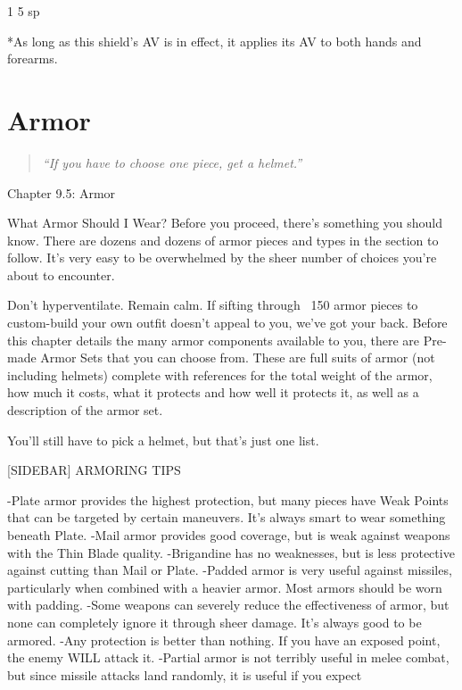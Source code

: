 \documentclass[oneside,11pt,english]{book}
\begin{document}
1 5 sp 

*As long as this shield’s AV is in effect, it applies its AV to both hands and forearms. 

 

\chapter{Armor}
\startcontents[chapters]
\clearpage
\begin{quote}
	\centering
	\emph{“If you have to choose one piece, get a helmet.” }
\end{quote}
Chapter 9.5: Armor

What Armor Should I Wear?
Before you proceed, there’s something you should know. There are dozens and dozens of armor pieces and types in 
the section to follow. It’s very easy to be overwhelmed by the sheer number of choices you’re about to encounter. 

Don’t hyperventilate. Remain calm. If sifting through ~150 armor pieces to custom-build your own outfit doesn’t 
appeal to you, we’ve got your back. Before this chapter details the many armor components available to you, there are
Pre-made Armor Sets that you can choose from. These are full suits of armor (not including helmets) complete with 
references for the total weight of the armor, how much it costs, what it protects and how well it protects it, as well as a
description of the armor set.

You’ll still have to pick a helmet, but that’s just one list.

[SIDEBAR] ARMORING TIPS

-Plate armor provides the highest protection, but many pieces have Weak Points that can be targeted by certain 
maneuvers. It’s always smart to wear something beneath Plate.
-Mail armor provides good coverage, but is weak against weapons with the Thin Blade quality.
-Brigandine has no weaknesses, but is less protective against cutting than Mail or Plate.
-Padded armor is very useful against missiles, particularly when combined with a heavier armor. Most armors should 
be worn with padding.
-Some weapons can severely reduce the effectiveness of armor, but none can completely ignore it through sheer 
damage. It’s always good to be armored.
-Any protection is better than nothing. If you have an exposed point, the enemy WILL attack it. 
-Partial armor is not terribly useful in melee combat, but since missile attacks land randomly, it is useful if you expect 
\end{document}
